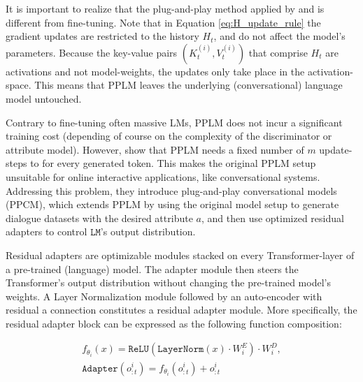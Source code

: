 It is important to realize that the plug-and-play method applied by \cite{dathathri2019plug} and \cite{madotto-etal-2020-plug} is different from fine-tuning. Note that in Equation \ref{eq:H_update_rule} the gradient updates are restricted to the history $H_t$, and do not affect the model's parameters. Because the key-value pairs $(K_t^{(i)}, V_t^{(i)})$ that comprise $H_t$ are activations and not model-weights, the updates only take place in the activation-space. This means that PPLM leaves the underlying (conversational) language model untouched.

Contrary to fine-tuning often massive LMs, PPLM does not incur a significant training cost (depending of course on the complexity of the discriminator or attribute model). However, \cite{madotto-etal-2020-plug} show that PPLM needs a fixed number of $m$ update-steps to for every generated token. This makes the original PPLM setup unsuitable for online interactive applications, like conversational systems. Addressing this problem, they introduce plug-and-play conversational models (PPCM), which extends PPLM by using the original model setup to generate dialogue datasets with the desired attribute $a$, and then use optimized residual adapters \citep{bapna-firat-2019-simple} to control $\texttt{LM}$'s output distribution. 

Residual adapters are optimizable modules stacked on every Transformer-layer of a pre-trained (language) model. The adapter module then steers the Transformer's output distribution without changing the pre-trained model's weights. A Layer Normalization module \citep{DBLP:journals/corr/BaKH16} followed by an auto-encoder with residual a connection constitutes a residual adapter module. More specifically, the residual adapter block can be expressed as the following function composition:

\begin{equation}
\begin{gathered}
    f_{\theta_i} (x) = \texttt{ReLU}(\texttt{LayerNorm} (x) \cdot W_i^E) \cdot W_i^D, \\
    \texttt{Adapter} (o_{:t}^i) = f_{\theta_i}(o_{:t}^i) + o_{:t}^i
\end{gathered}
\end{equation}


